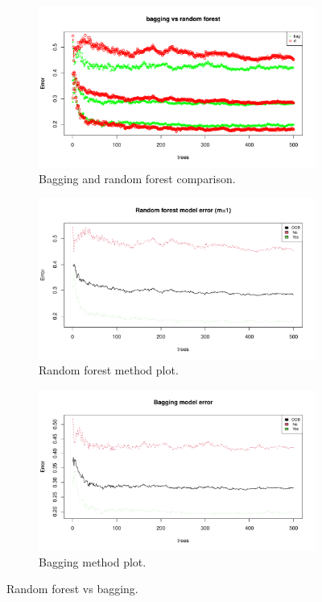 \begin{figure}[H]
	\centering
	\begin{subfigure}{.3\textwidth}
		\centering
		\includegraphics[width=\linewidth]{ImageFiles/Classification/Trees/vs_bagg_for_500_plot}
		\caption{Bagging and random forest comparison.}
		\label{fig:vs_bagg_for_500_plot}
	\end{subfigure}%
	\hfill
	\begin{subfigure}{.3\textwidth}
		\centering
		\includegraphics[width=\linewidth]{ImageFiles/Classification/Trees/best_for_500_plot}
		\caption{Random forest method plot.}
		\label{fig:best_for_500_plot}
	\end{subfigure}%
	\hfill
	\begin{subfigure}{.3\textwidth}
		\centering
		\includegraphics[width=\linewidth]{ImageFiles/Classification/Trees/bagg_500_plot}
		\caption{Bagging method plot.}
		\label{fig:bagg_500_plot}
	\end{subfigure}
	\caption{Random forest vs bagging.}
	\label{fig:RFvsB}
\end{figure}

